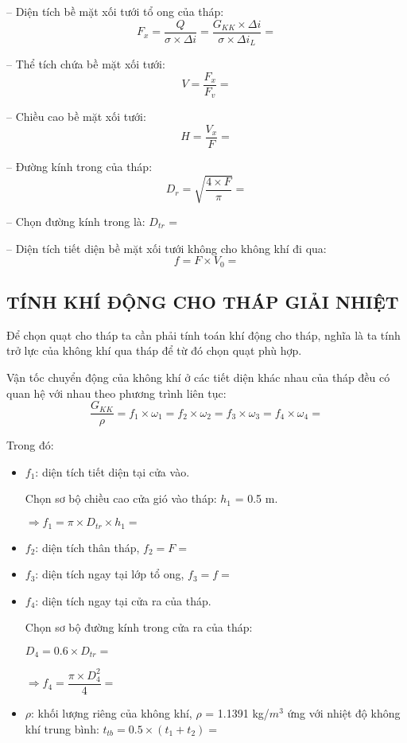 -- Diện tích bề mặt xối tưới tổ ong của tháp:
\begin{equation*}
	F_{x} = \dfrac{Q}{\sigma\times \Delta i} = \dfrac{G_{KK}\times\Delta i}{\sigma\times \Delta i_{L}} = 
\end{equation*}

-- Thể tích chứa bề mặt xối tưới:
\begin{equation*}
	V = \dfrac{F_{x}}{F_{v}} = 
\end{equation*}

-- Chiều cao bề mặt xối tưới:
\begin{equation*}
	H = \dfrac{V_{x}}{F} = 
\end{equation*}

-- Đường kính trong của tháp:
\begin{equation*}
	D_{r} = \sqrt{\dfrac{4\times F}{\pi}} = 
\end{equation*}

-- Chọn đường kính trong là: $D_{tr}$ = 

-- Diện tích tiết diện bề mặt xối tưới không cho không khí đi qua:
\begin{equation*}
	f = F\times V_{0} = 
\end{equation*}

\subsection{TÍNH KHÍ ĐỘNG CHO THÁP GIẢI NHIỆT}
Để chọn quạt cho tháp ta cần phải tính toán khí động cho tháp, nghĩa là ta tính trở lực của không khí qua tháp để từ đó chọn quạt phù hợp.

Vận tốc chuyển động của không khí ở các tiết diện khác nhau của tháp đều có quan hệ với nhau theo phương trình liên tục:
\begin{equation*}
	\dfrac{G_{KK}}{\rho} = f_{1}\times\omega_{1} = f_{2}\times\omega_{2} = f_{3}\times\omega_{3} = f_{4}\times\omega_{4} = 
\end{equation*}

Trong đó:
\begin{itemize}
	\item $f_{1}$: diện tích tiết diện tại cửa vào.
	
	Chọn sơ bộ chiều cao cửa gió vào tháp: $h_{1}$ = 0.5 m.
	
	$\Rightarrow f_{1} = \pi\times D_{tr}\times h_{1} = $
	\item $f_{2}$: diện tích thân tháp, $f_{2} = F = $
	\item $f_{3}$: diện tích ngay tại lớp tổ ong, $f_{3} = f = $
	\item $f_{4}$: diện tích ngay tại cửa ra của tháp.
	
	Chọn sơ bộ đường kính trong cửa ra của tháp:
	
	$D_{4} = 0.6\times D_{tr} = $
	
	$\Rightarrow f_{4} = \dfrac{\pi\times D_{4}^2}{4} = $
	
	\item $\rho$: khối lượng riêng của không khí, $\rho$ = 1.1391 kg/$m^3$ ứng với nhiệt độ không khí trung bình: $t_{tb} = 0.5\times(t_{1} + t_{2}) = $
\end{itemize}


